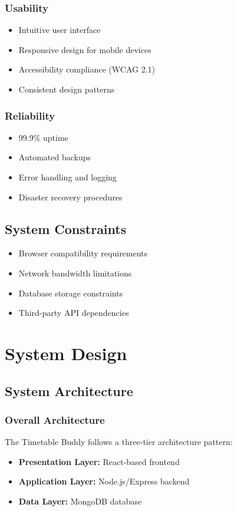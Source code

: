 \documentclass[12pt,a4paper]{report}
\begin{document}
\subsection{Usability}
\begin{itemize}[leftmargin=*]
    \item Intuitive user interface
    \item Responsive design for mobile devices
    \item Accessibility compliance (WCAG 2.1)
    \item Consistent design patterns
\end{itemize}

\subsection{Reliability}
\begin{itemize}[leftmargin=*]
    \item 99.9\% uptime
    \item Automated backups
    \item Error handling and logging
    \item Disaster recovery procedures
\end{itemize}

\section{System Constraints}
\begin{itemize}[leftmargin=*]
    \item Browser compatibility requirements
    \item Network bandwidth limitations
    \item Database storage constraints
    \item Third-party API dependencies
\end{itemize}

\chapter{System Design}

\section{System Architecture}

\subsection{Overall Architecture}
The Timetable Buddy follows a three-tier architecture pattern:
\begin{itemize}[leftmargin=*]
    \item \textbf{Presentation Layer:} React-based frontend
    \item \textbf{Application Layer:} Node.js/Express backend
    \item \textbf{Data Layer:} MongoDB database
\end{itemize}
\end{document}
